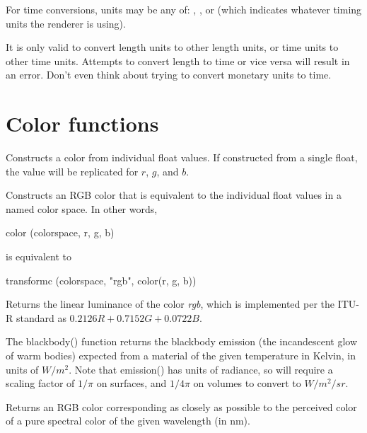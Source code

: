 \documentclass[11pt,letterpaper]{book}
\def\color{{\cf color}\xspace}
\def\float{{\cf float}\xspace}
\begin{document}
For time conversions, units may be any of: , , or
 (which indicates whatever timing units the renderer is
using).

It is only valid to convert length units to other length units, or time
units to other time units.  Attempts to convert length to time or vice
versa will result in an error.  Don't even think about trying to convert
monetary units to time.
\apiend



\section{Color functions}
\label{sec:stdlib:color}

Constructs a \color from individual \float values.  If constructed
from a single \float, the value will be replicated for $r$, $g$, and $b$.
\apiend

Constructs an RGB \color that is equivalent to the individual \float values in a
named color space.  In other words,
\begin{code}
    color (colorspace, r, g, b)
\end{code}
\noindent is equivalent to
\begin{code}
    transformc (colorspace, "rgb", color(r, g, b))
\end{code}
\apiend

Returns the linear luminance of the color \emph{rgb}, which is
implemented per the ITU-R standard as $0.2126 R + 0.7152 G + 0.0722 B$.
\apiend


The {\cf blackbody()} function returns the blackbody emission (the
incandescent glow of warm bodies) expected from a material of the given
temperature in Kelvin, in units of $W/m^2$. Note that {\cf emission()} has units
of radiance, so will require a scaling factor of $1/\pi$ on surfaces, and
$1/4\pi$ on volumes to convert to $W/m^2/sr$.
\apiend

Returns an RGB color corresponding as closely as possible to the
perceived color of a pure spectral color of the given wavelength (in nm).
\apiend
\end{document}
